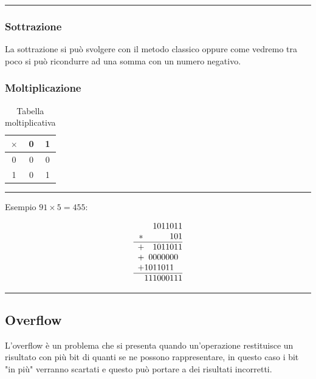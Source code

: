 \documentclass{article}
\begin{document}
\noindent\rule{\textwidth}{0.5pt}

\subsubsection{Sottrazione}

La sottrazione si può svolgere con il metodo classico oppure come vedremo tra poco si può ricondurre ad una somma con un numero negativo.

\newpage

\subsubsection{Moltiplicazione}
 
\begin{table}[ht]
    \centering
    \begin{tabular}{|c|c|c|}
        \hline
        $\times $ & 0 & 1\\
        \hline
        0 & 0 & 0\\
        \hline
        1 & 0 & 1\\
        \hline
    \end{tabular}
    \caption{Tabella moltiplicativa}
    \label{tab:mult_tab}
\end{table}

\noindent\rule{\textwidth}{0.5pt}

\noindent Esempio $91 \times 5 = 455$:

\[
\begin{array}{c@{}c@{}c@{}c@{}c@{}c@{}c@{}c@{}c@{}c@{}}
   & & & 1 & 0 & 1 & 1 & 0 & 1 & 1 \\
 * & & & &  &  &  & 1 & 0 & 1 \\
\hline
 + & & & 1 & 0 & 1 & 1 & 0 & 1 & 1 \\
 + & & 0 & 0 & 0 & 0 & 0 & 0 & 0 & \\
 + & 1 & 0 & 1 & 1 & 0 & 1 & 1 & \\
  \hline
  & 1 & 1 & 1 & 0 & 0 & 0 & 1 & 1 & 1
\end{array}
\]

\noindent\rule{\textwidth}{0.5pt}

\subsection{Overflow}

L'overflow è un problema che si presenta quando un'operazione restituisce un risultato con più bit di quanti se ne possono rappresentare, in questo caso i bit "in più" verranno scartati e questo può portare a dei risultati incorretti.
\end{document}
